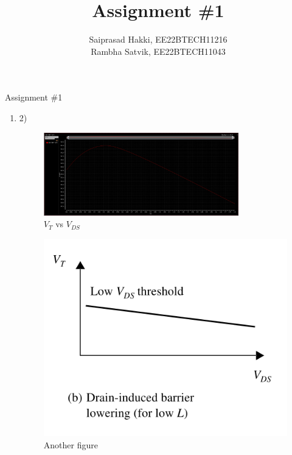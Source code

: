 \documentclass[journal, onecolumn]{IEEEtran} %
\begin{document}
\title{Assignment \#1}
\author{Saiprasad Hakki, \normalsize{EE22BTECH11216}\\
		Rambha Satvik, \normalsize{EE22BTECH11043}}%
\maketitle
{}%
{Assignment \#1}

\begin{enumerate}[2.]
	\item2) {
		\begin{figure}[htpb]
			\centering
			\includegraphics[width=0.8\textwidth]{VtVd}
			\caption{$V_{T}$ vs $V_{DS}$}
			\label{fig:VtVd}
		\end{figure}
		\begin{figure}[htpb]
		    \centering
		    \includegraphics[width=.4\linewidth]{VtVdEx}
		    \caption{Another figure}
		    \label{fig:test2}
		\end{figure}
	}


\end{enumerate}
\end{document}
